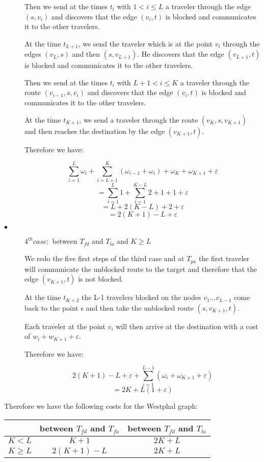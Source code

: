 \documentclass[a4paper, 10pt]{article}
\begin{document}
\begin{description}
Then we send at the times $t_i$ with $1 < i \leq L$ a traveler through the edge $(s,v_i)$ and discovers that the edge $(v_i,t)$ is blocked and communicates it to the other travelers.

At the time $t_{L+1}$, we send the traveler which is at the point $v_l$ through the edges $(v_{L},s)$ and then $(s,v_{L+1})$. He discovers that the edge $(v_{L+1},t)$ is blocked and communicates it to the other travelers.

Then we send at the times $t_i$ with $L+1 < i \leq K$ a traveler through the route $(v_{i-1},s,v_i)$ and discovers that the edge $(v_i,t)$ is blocked and communicates it to the other travelers.

At the time $t_{K+1}$, we send a traveler through the route $(v_K,s,v_{K+1})$ and then reaches the destination by the edge $(v_{K+1},t)$. 

Therefore we have: 

\[
\sum_{i=1}^{L} \omega_{i} + \sum_{i=L+1}^{K}(\omega_{i-1} + \omega_{i} ) + \omega_{K} + \omega_{K+1} + \varepsilon
\]
\[
=\sum_{i=1}^{L} 1 + \sum_{i=1}^{K-L}2 + 1 + 1 + \varepsilon
\]
\[
= L + 2(K - L) + 2 + \varepsilon
\]
\[
= 2(K + 1 ) - L + \varepsilon
\]

\item[$\bullet$] $4^{th} case:$ between $T_{fd}$ and $T_{la}$ and $K \geq L$

We redo the five first steps of the third case and at $ T_{pa}$ the first traveler will communicate the unblocked route to the target and therefore that the edge $(v_{K+1},t)$ is not blocked.

At the time $t_{K+2}$ the L-1 travelers blocked on the nodes $v_{1} ... v_{L-1} $ come back to the point s and then take the unblocked route $(s,v_{K+1},t)$.

Each traveler at the point $v_i$ will then arrive at the destination with a cost of $w_i + w_{K+1} + \varepsilon$. 

Therefore we have:

\[
2(K + 1) - L + \varepsilon + \sum_{i=1}^{L-1}(\omega_{i} + \omega_{K+1} + \varepsilon )
\]
\[
= 2K + L(1+\varepsilon)
\]

\end{description}

Therefore we have the following costs for the Westphal graph:

\begin{center}
\begin{tabular}{|c|c|c|}
\hline
 & between $T_{fd}$ and $T_{fa}$  & between $T_{fd}$ and $ T_{la}$ \\ 
\hline
 ${K<L}$  & ${K + 1}$ & ${ 2K + L}$   \\ 
\hline
 ${K \geq L}$  & ${2(K+1) - L}$ & ${2K + L}$   \\ 
\hline
\end{tabular}
\end{center}
\end{document}
